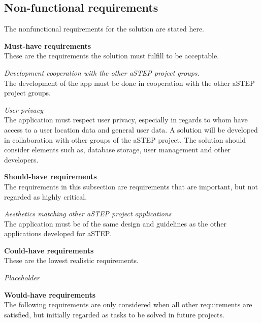 \subsection{Non-functional requirements}
The nonfunctional requirements for the solution are stated here.

\textbf{Must-have requirements}\\
These are the requirements the solution must fulfill to be acceptable.

\textit{Development cooperation with the other aSTEP project groups.}\\
The development of the app must be done in cooperation with the other aSTEP project groups.

\textit{User privacy}\\
The application must respect user privacy, especially in regards  to whom have access to a user location data and general user data.
A solution will be developed in collaboration with other groups of the aSTEP project. The solution should consider elements such as, database storage, user management and other developers.

\textbf{Should-have requirements}\\
The requirements in this subsection are requirements that are important, but not regarded as highly critical.

\textit{Aesthetics matching other aSTEP project applications}\\
The application must be of the same design and guidelines as the other applications developed for aSTEP.

\textbf{Could-have requirements}\\
These are the lowest realistic requirements. 

\textit{Placeholder}\\

\textbf{Would-have requirements}\\
The following requirements are only considered when all other requirements are satisfied, but initially regarded as tasks to be solved in future projects.

